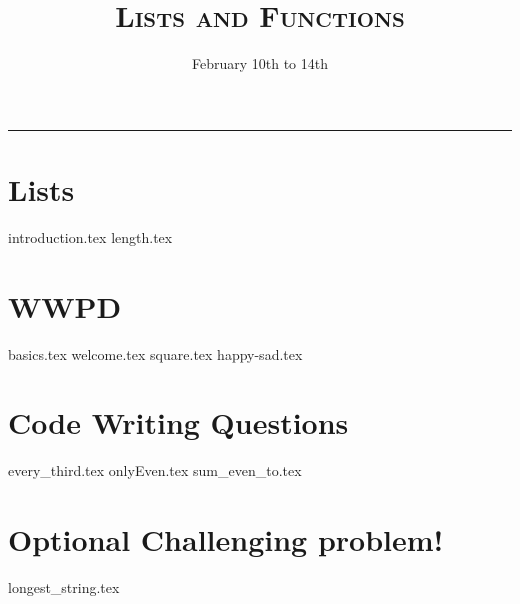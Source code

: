 \documentclass{exam}
\title{\textsc{Lists and Functions}}
\date{February 10th to 14th}
\begin{document}
\maketitle
\rule{\textwidth}{0.15em}
\fontsize{12}{15}\selectfont


\section{Lists}
\begin{questions}
{introduction.tex}
{length.tex}
\newpage
\section{WWPD}
{basics.tex}
\vspace{3em}
{welcome.tex}
\newpage
{square.tex}
{happy-sad.tex}

\newpage
\section{Code Writing Questions}
{every_third.tex}
{onlyEven.tex}
{sum_even_to.tex}
\newpage
\section{Optional Challenging problem!}
{longest_string.tex}

\end{questions}
\end{document}
